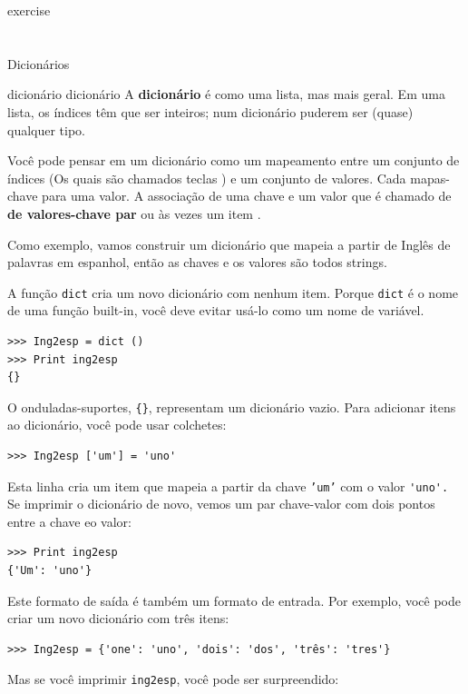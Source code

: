 \documentclass[10pt]{book}
\begin{document}
\begin{exercise}
\begin{}
\begin{enumerate}
\end{enumerate}
\end{} exercise


\chapter{} Dicionários

\index{} dicionário
\index{} dicionário
A {\bf dicionário} é como uma lista, mas mais geral. Em uma lista,
os índices têm que ser inteiros; num dicionário puderem
ser (quase) qualquer tipo.

Você pode pensar em um dicionário como um mapeamento entre um conjunto de índices
(Os quais são chamados teclas {\bf}) e um conjunto de valores. Cada mapas-chave para uma
valor. A associação de uma chave e um valor que é chamado de {\bf
  de valores-chave par} ou {às vezes um item \bf}.

Como exemplo, vamos construir um dicionário que mapeia a partir de Inglês
de palavras em espanhol, então as chaves e os valores são todos strings.

A função {\tt dict} cria um novo dicionário com nenhum item.
Porque {\tt dict} é o nome de uma função built-in, você
deve evitar usá-lo como um nome de variável.

\begin{verbatim}
>>> Ing2esp = dict ()
>>> Print ing2esp
{}
\end{verbatim}

O onduladas-suportes, \verb "{}", representam um dicionário vazio.
Para adicionar itens ao dicionário, você pode usar colchetes:

\begin{verbatim}
>>> Ing2esp ['um'] = 'uno'
\end{verbatim}
%
Esta linha cria um item que mapeia a partir da chave
{\tt 'um'} com o valor \verb "'uno'." Se imprimir o
dicionário de novo, vemos um par chave-valor com dois pontos
entre a chave eo valor:

\begin{verbatim}
>>> Print ing2esp
{'Um': 'uno'}
\end{verbatim}
%
Este formato de saída é também um formato de entrada. Por exemplo,
você pode criar um novo dicionário com três itens:

\begin{verbatim}
>>> Ing2esp = {'one': 'uno', 'dois': 'dos', 'três': 'tres'}
\end{verbatim}
%
Mas se você imprimir {\tt ing2esp}, você pode ser surpreendido:


\end{exercise}
\end{document}
